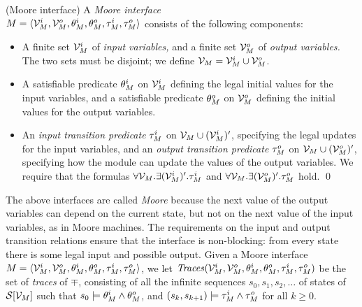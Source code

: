 \begin{defi}{(Moore interface)}
A {\em Moore interface\/} \\ 
$M = \langle {\cal V}^i_M, {\cal V}^o_M,
\theta^i_M, \theta^o_M, \tau^i_M, \tau^o_M \rangle$
consists of the following components: 
%
\begin{itemize}

\item A finite set ${\cal V}^i_M$ of {\em input variables,} and a finite
set ${\cal V}^o_M$ of {\em output variables.}
The two sets must be disjoint; 
we define ${\cal V}_M = {\cal V}^i_M \cup {\cal V}^o_M$.


\item A satisfiable predicate $\theta^i_M$ on ${\cal V}^i_M$
defining the legal initial values for the input variables, and 
a satisfiable predicate $\theta^o_M$ on ${\cal V}^o_M$
defining the initial values for the output variables. 

\item An {\em input transition predicate\/}
$\tau^i_M$ on ${\cal V}_M \cup ({\cal V}^i_M)'$, 
specifying the legal updates for
the input variables, and an {\em output transition predicate\/}
$\tau^o_M$ on ${\cal V}_M \cup ({\cal V}^o_M)'$, 
specifying how the module can update the values of the output variables. 
We require that the formulas 
$\forall {\cal V}_M . \exists ({\cal V}^i_M)' . \tau^i_M$ 
and 
$\forall {\cal V}_M . \exists ({\cal V}^o_M)' . \tau^o_M$ 
hold. \qed 
\end{itemize}
\end{defi}

\noindent
The above interfaces are called {\em Moore\/} because 
the next value of the output variables can depend on the
current state, but not on the next value of the input variables, 
as in Moore machines. 
The requirements on the input and output transition relations ensure
that the interface is non-blocking: from every state there is 
some legal input and possible output. 
Given a Moore interface $M = \langle {\cal V}^i_M, {\cal V}^o_M,
\theta^i_M, \theta^o_M, \tau^i_M, \tau^o_M \rangle$, we let
${\text{\textit{Traces}}}({\cal V}^i_M, {\cal V}^o_M, \theta^i_M, \theta^o_M, \tau^i_M,
\tau^o_M)$ be the set of {\em traces\/} of $\mp$, consisting of all
the infinite sequences $s_0, s_1, s_2, \ldots$ of states of 
${\cal S}[{\cal V}_M]$ such that $s_0 \models \theta^i_M \wedge \theta^o_M$, 
and $(s_k,s_{k+1}) \models \tau^i_M \wedge \tau^o_M$ for all $k \geq 0$.

